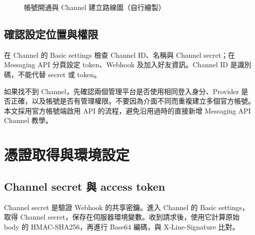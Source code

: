 \documentclass[12pt,a4paper]{report}
\begin{document}
\begin{figure}[htbp]
\centering
{}
\caption{帳號開通與 Channel 建立路線圖（自行繪製）}\label{fig:registration}
\end{figure}

\section{確認設定位置與權限}
在 Channel 的 Basic settings 檢查 Channel ID、名稱與 Channel secret；在 Messaging API 分頁設定 token、Webhook 及加入好友資訊。Channel ID 是識別碼，不能代替 secret 或 token。

如果找不到 Channel，先確認兩個管理平台是否使用相同登入身分、Provider 是否正確，以及帳號是否有管理權限。不要因為介面不同而重複建立多個官方帳號。本文採用官方帳號端啟用 API 的流程，避免沿用過時的直接新增 Messaging API Channel 教學。
\clearpage
\chapter{憑證取得與環境設定}
\section{Channel secret 與 access token}
Channel secret 是驗證 Webhook 的共享密鑰。進入 Channel 的 Basic settings，取得 Channel secret，保存在伺服器環境變數。收到請求後，使用它計算原始 body 的 HMAC-SHA256，再進行 Base64 編碼，與 X-Line-Signature 比對。
\end{document}
